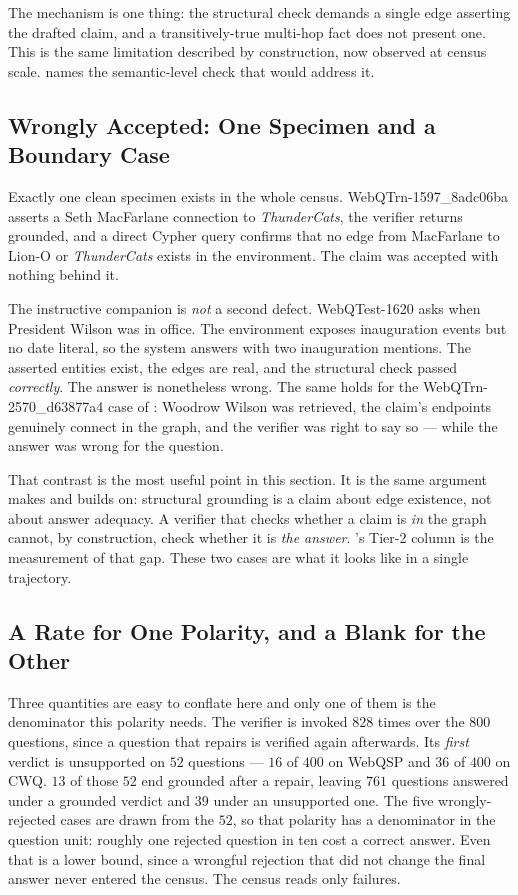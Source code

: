 The mechanism is one thing: the structural check demands a single edge asserting
the drafted claim, and a transitively-true multi-hop fact does not present one.
This is the same limitation  described by
construction, now observed at census scale.  names the
semantic-level check that would address it.

\subsection{Wrongly Accepted: One Specimen and a Boundary Case}

Exactly one clean specimen exists in the whole census.
\textsf{WebQTrn-1597\_8adc06ba} asserts a Seth MacFarlane connection to
\emph{ThunderCats}, the verifier returns \textsf{grounded}, and a direct Cypher
query confirms that no edge from MacFarlane to Lion-O or \emph{ThunderCats}
exists in the environment. The claim was accepted with nothing behind it.

The instructive companion is \emph{not} a second defect. \textsf{WebQTest-1620}
asks when President Wilson was in office. The environment exposes inauguration
events but no date literal, so the system answers with two inauguration
mentions. The asserted entities exist, the edges are real, and the structural
check passed \emph{correctly}. The answer is nonetheless wrong. The same holds
for the \textsf{WebQTrn-2570\_d63877a4} case of :
Woodrow Wilson was retrieved, the claim's endpoints genuinely connect in the
graph, and the verifier was right to say so --- while the answer was wrong for
the question.

That contrast is the most useful point in this section. It is the same
argument  makes and  builds
on: structural grounding is a claim about edge existence, not about answer
adequacy. A verifier that checks whether a claim is \emph{in} the graph cannot,
by construction, check whether it is \emph{the answer}.
's Tier-2 column is the measurement of that gap. These
two cases are what it looks like in a single trajectory.

\subsection{A Rate for One Polarity, and a Blank for the Other}

Three quantities are easy to conflate here and only one of them is the
denominator this polarity needs. The verifier is invoked $828$ times over the
$800$ questions, since a question that repairs is verified again afterwards. Its
\emph{first} verdict is \textsf{unsupported} on $52$ questions --- $16$ of $400$
on WebQSP and $36$ of $400$ on CWQ. $13$ of those $52$ end
\textsf{grounded} after a repair, leaving $761$ questions answered under a
grounded verdict and $39$ under an unsupported one. The five wrongly-rejected
cases are drawn from the $52$, so that polarity has a denominator in the
question unit: roughly one rejected question in ten cost a correct answer. Even
that is a lower bound, since a wrongful rejection that did not change the final
answer never entered the census. The census reads only failures.

